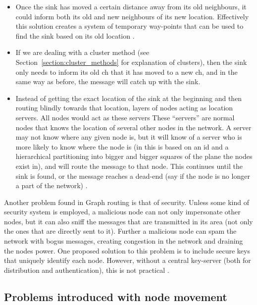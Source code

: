 \begin{itemize}
\item Once the sink has moved a certain distance away from its old neighbours, it could inform both its old and new neighbours of its new location. Effectively this solution creates a system of temporary way-points that can be used to find the sink based on its old location \cite{adaptive}.
\item If we are dealing with a cluster method (see Section~\ref{section:cluster_methods} for explanation of clusters), then the sink only needs to inform its old \ac{ch} that it has moved to a new \ac{ch}, and in the same way as before, the message will catch up with the sink.
\item Instead of getting the exact location of the sink at the beginning and then routing blindly towards that location, layers of nodes acting as location servers. All nodes would act as these servers These ``servers'' are normal nodes that knows the location of several other nodes in the network. A server may not know where any given node is, but it will know of a server who is more likely to know where the node is (in \cite{scaleLocation} this is based on an id and a hierarchical partitioning into bigger and bigger squares of the plane the nodes exist in), and will route the message to that node. This continues until the sink is found, or the message reaches a dead-end (say if the node is no longer a part of the network) \cite{scaleLocation}.
\end{itemize}

Another problem found in Graph routing is that of security. Unless some kind of security system is employed, a malicious node can not only impersonate other nodes, but it can also sniff the messages that are transmitted in its area (not only the ones that are directly sent to it). Further a malicious node can spam the network with bogus messages, creating congestion in the network and draining the nodes power. One proposed solution to this problem is to include secure keys that uniquely identify each node. However, without a central key-server (both for distribution and authentication), this is not practical \cite{trustedRouting}.

\subsection{Problems introduced with node movement}


